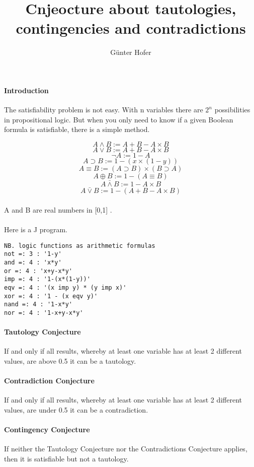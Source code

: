 \documentclass[12pt,a4paper]{article}
\begin{document}
\title{Cnjeocture about tautologies, contingencies
and contradictions}
\author{Günter Hofer}
\maketitle
\newpage 
\paragraph{Introduction}
The satisfiability problem is not easy. With n variables there are $2^n$ possibilities in propositional logic. But when you only need to know if a given Boolean formula
is satisfiable, there is a simple method.


\[A \land B := A + B - A \times B\]
\[A \lor B 		:= A + B - A \times B\]
\[\lnot A := 1 - A\]
\[A \supset B := 1 - (x \times (1 - y))\]
\[A \equiv B := (A \supset B) \times (B \supset A) \]
\[A \oplus B := 1 - (A \equiv B)\]
\[A \bar{\land} B := 1- A \times B\]
\[A \bar{\lor}B := 1 - (A + B - A \times B)\]
\paragraph{}
A and B are real numbers in [0,1] .
\paragraph{}
Here is a J program.
\begin{verbatim}
NB. logic functions as arithmetic formulas
not =: 3 : '1-y'
and =: 4 : 'x*y'
or =: 4 : 'x+y-x*y'
imp =: 4 : '1-(x*(1-y))'
eqv =: 4 : '(x imp y) * (y imp x)'
xor =: 4 : '1 - (x eqv y)'
nand =: 4 : '1-x*y'
nor =: 4 : '1-x+y-x*y'
\end{verbatim}

\paragraph{Tautology Conjecture}
If and only if all results, whereby at least one variable has at least 2 different values, are above 0.5 it can be a tautology.

\paragraph{Contradiction Conjecture}
If and only if all results, whereby at least one variable has at least 2 different values, are under 0.5 it can be a contradiction.

\paragraph{Contingency Conjecture}
If neither the Tautology Conjecture nor the Contradictions Conjecture applies, then it is satisfiable but not a tautology.
\newpage 
\end{document}
